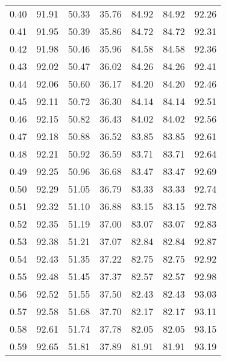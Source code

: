 \begin{tabular}{|c|c|c|c|c|c|c|}
      0.40 &     91.91 &     50.33 &      35.76 &   84.92 &      84.92 &         92.26 \\
      0.41 &     91.95 &     50.39 &      35.86 &   84.72 &      84.72 &         92.31 \\
      0.42 &     91.98 &     50.46 &      35.96 &   84.58 &      84.58 &         92.36 \\
      0.43 &     92.02 &     50.47 &      36.02 &   84.26 &      84.26 &         92.41 \\
      0.44 &     92.06 &     50.60 &      36.17 &   84.20 &      84.20 &         92.46 \\
      0.45 &     92.11 &     50.72 &      36.30 &   84.14 &      84.14 &         92.51 \\
      0.46 &     92.15 &     50.82 &      36.43 &   84.02 &      84.02 &         92.56 \\
      0.47 &     92.18 &     50.88 &      36.52 &   83.85 &      83.85 &         92.61 \\
      0.48 &     92.21 &     50.92 &      36.59 &   83.71 &      83.71 &         92.64 \\
      0.49 &     92.25 &     50.96 &      36.68 &   83.47 &      83.47 &         92.69 \\
      0.50 &     92.29 &     51.05 &      36.79 &   83.33 &      83.33 &         92.74 \\
      0.51 &     92.32 &     51.10 &      36.88 &   83.15 &      83.15 &         92.78 \\
      0.52 &     92.35 &     51.19 &      37.00 &   83.07 &      83.07 &         92.83 \\
      0.53 &     92.38 &     51.21 &      37.07 &   82.84 &      82.84 &         92.87 \\
      0.54 &     92.43 &     51.35 &      37.22 &   82.75 &      82.75 &         92.92 \\
      0.55 &     92.48 &     51.45 &      37.37 &   82.57 &      82.57 &         92.98 \\
      0.56 &     92.52 &     51.55 &      37.50 &   82.43 &      82.43 &         93.03 \\
      0.57 &     92.58 &     51.68 &      37.70 &   82.17 &      82.17 &         93.11 \\
      0.58 &     92.61 &     51.74 &      37.78 &   82.05 &      82.05 &         93.15 \\
      0.59 &     92.65 &     51.81 &      37.89 &   81.91 &      81.91 &         93.19 \\

\end{tabular}
